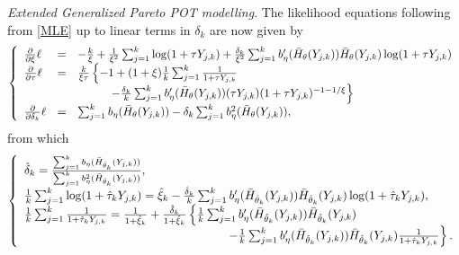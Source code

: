 \documentclass[twoside,leqno,11pt]{article}
\begin{document}
\vspace{0.2cm}\noindent
{\it Extended Generalized Pareto POT modelling}. 
The likelihood equations following from \eqref{MLE} up to linear terms in $\delta_k$ are now given by
\[
\left\{
\begin{array}{lcl}
{\partial \over \partial \xi} \ell &=&
-{k \over \xi }+ {1 \over \xi^2} \sum_{j=1}^k \log (1+\tau Y_{j,k})
 + {\delta_k \over \xi^2} \sum_{j=1}^k  b'_\eta (\bar{H}_{\theta}(Y_{j,k}))\bar{H}_{\theta}(Y_{j,k})\log (1+\tau Y_{j,k}) \\
 {\partial \over \partial \tau} \ell &=&
{k \over \xi \tau}
\left\{ -1+ (1+\xi) {1 \over k}\sum_{j=1}^k {1 \over 1+\tau Y_{j,k}} \right. \\
&& \hspace{1cm} \left. 
 -{\delta_k \over k}\sum_{j=1}^k b'_\eta (\bar{H}_{\theta}(Y_{j,k})) (\tau Y_{j,k}) (1+\tau Y_{j,k})^{-1-1/\xi}
   \right\}
 \\
 {\partial \over \partial \delta_k} \ell &=&
 \sum_{j=1}^k b_\eta (\bar{H}_{\theta}(Y_{j,k}))-\delta_k \sum_{j=1}^k b^2_\eta (\bar{H}_{\theta}(Y_{j,k})),
\end{array}
\right.
\]
from which
\begin{equation}
 \left\{
\begin{array}{l}
\hat{\delta}_k = \frac{\sum_{j=1}^k b_\eta (\bar{H}_{\hat{\theta}_k}(Y_{j,k}))}{\sum_{j=1}^k b^2_\eta (\bar{H}_{\hat{\theta}_k}(Y_{j,k}))}, \\
{1 \over k}\sum_{j=1}^k \log (1+\hat{\tau}_k Y_{j,k})
= \hat{\xi}_k- 
{\hat{\delta}_k \over k}\sum_{j=1}^k b'_{\eta}(\bar{H}_{\hat{\theta}_k}(Y_{j,k})) \bar{H}_{\hat{\theta}_k}(Y_{j,k}) \log (1+\hat{\tau}_k Y_{j,k}), \\
{1 \over k}\sum_{j=1}^k {1 \over 1+\hat{\tau}_k Y_{j,k}}
= {1 \over 1+ \hat{\xi}_k}  
+ {\hat{\delta}_k \over 1+ \hat{\xi}_k}
\left\{ 
{1\over k}\sum_{j=1}^k b'_{\eta}(\bar{H}_{\hat{\theta}_k}(Y_{j,k}))\bar{H}_{\hat{\theta}_k}(Y_{j,k}) \right.\\
 \hspace{6cm} \left.
- {1\over k}\sum_{j=1}^k b'_{\eta}(\bar{H}_{\hat{\theta}_k}(Y_{j,k}))\bar{H}_{\hat{\theta}_k}(Y_{j,k}) {1 \over 1+\hat{\tau}_k Y_{j,k}}
 \right\}.
\end{array}
\right.
\label{systemE}
\end{equation}
\end{document}
